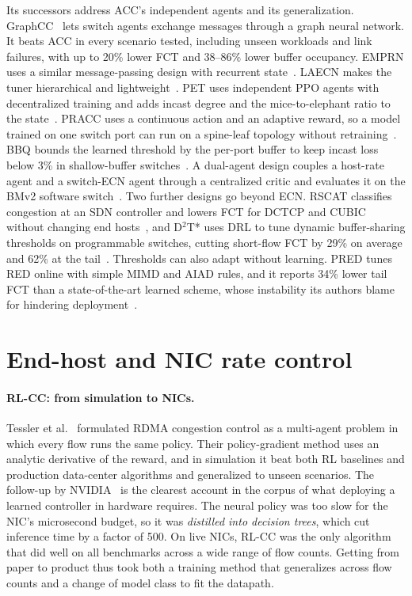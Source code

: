Its successors address ACC's independent agents and its generalization. GraphCC~\cite{bernardez2024graphcc} lets switch agents exchange messages through a graph neural network. It beats ACC in every scenario tested, including unseen workloads and link failures, with up to 20\% lower FCT and 38--86\% lower buffer occupancy. EMPRN uses a similar message-passing design with recurrent state~\cite{zaeri2024emprn}. LAECN makes the tuner hierarchical and lightweight~\cite{hu2024lightweight}. PET uses independent PPO agents with decentralized training and adds incast degree and the mice-to-elephant ratio to the state~\cite{cheng2024pet}. PRACC uses a continuous action and an adaptive reward, so a model trained on one switch port can run on a spine-leaf topology without retraining~\cite{he2025deep}. BBQ bounds the learned threshold by the per-port buffer to keep incast loss below 3\% in shallow-buffer switches~\cite{zhang2024bbq}. A dual-agent design couples a host-rate agent and a switch-ECN agent through a centralized critic and evaluates it on the BMv2 software switch~\cite{chaurasiya2026cross}. Two further designs go beyond ECN. RSCAT classifies congestion at an SDN controller and lowers FCT for DCTCP and CUBIC without changing end hosts~\cite{diel2023rscat}, and D$^2$T* uses DRL to tune dynamic buffer-sharing thresholds on programmable switches, cutting short-flow FCT by 29\% on average and 62\% at the tail~\cite{liu2025automatic}. Thresholds can also adapt without learning. PRED tunes RED online with simple MIMD and AIAD rules, and it reports 34\% lower tail FCT than a state-of-the-art learned scheme, whose instability its authors blame for hindering deployment~\cite{pred2025revisiting}.

\section{End-host and NIC rate control}
\label{sec:dc-host}

\paragraph{RL-CC: from simulation to NICs.} Tessler et al.~\cite{tessler2022rlcc} formulated RDMA congestion control as a multi-agent problem in which every flow runs the same policy. Their policy-gradient method uses an analytic derivative of the reward, and in simulation it beat both RL baselines and production data-center algorithms and generalized to unseen scenarios. The follow-up by NVIDIA~\cite{fuhrer2023nvidia} is the clearest account in the corpus of what deploying a learned controller in hardware requires. The neural policy was too slow for the NIC's microsecond budget, so it was \emph{distilled into decision trees}, which cut inference time by a factor of 500. On live NICs, RL-CC was the only algorithm that did well on all benchmarks across a wide range of flow counts. Getting from paper to product thus took both a training method that generalizes across flow counts and a change of model class to fit the datapath.

